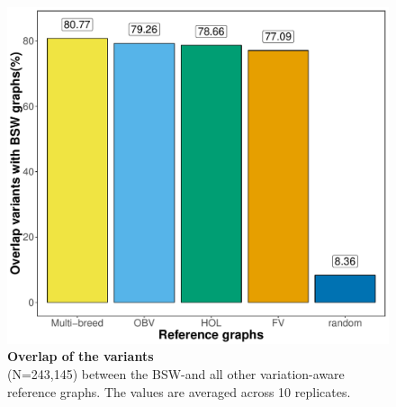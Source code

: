\documentclass[../main.tex]{subfiles}
\begin{document}
\begin{flushleft}
\begin{figure}[!htb]
    \centering
    \includegraphics[width=\textwidth]{paper2/supplement/sp38.pdf}
    \caption[Overlap of the variants]{\textbf{Overlap of the variants} \\
    \small{(N=243,145) between the BSW-and all other
    variation-aware reference graphs. The values are averaged across 10 replicates.}}
    \label{sup_fig:s38}
\end{figure}


\end{flushleft}
\end{document}
